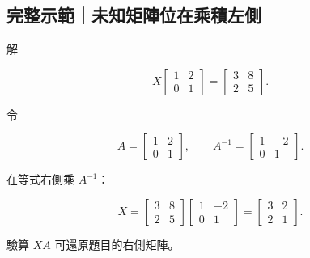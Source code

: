 \documentclass[11pt,a4paper]{article}
\begin{document}
\begin{HandoutWorkedExample}

\subsection{完整示範｜未知矩陣位在乘積左側}\label{ux5b8cux6574ux793aux7bc4ux672aux77e5ux77e9ux9663ux4f4dux5728ux4e58ux7a4dux5de6ux5074}

解

\[
X
\begin{bmatrix}1&2\\0&1\end{bmatrix}
=
\begin{bmatrix}3&8\\2&5\end{bmatrix}.
\]

令

\[
A=\begin{bmatrix}1&2\\0&1\end{bmatrix},
\qquad
A^{-1}=\begin{bmatrix}1&-2\\0&1\end{bmatrix}.
\]

在等式右側乘 \(A^{-1}\)：

\[
X=
\begin{bmatrix}3&8\\2&5\end{bmatrix}
\begin{bmatrix}1&-2\\0&1\end{bmatrix}
=
\boxed{\begin{bmatrix}3&2\\2&1\end{bmatrix}}.
\]

驗算 \(XA\) 可還原題目的右側矩陣。

\end{HandoutWorkedExample}
\end{document}
